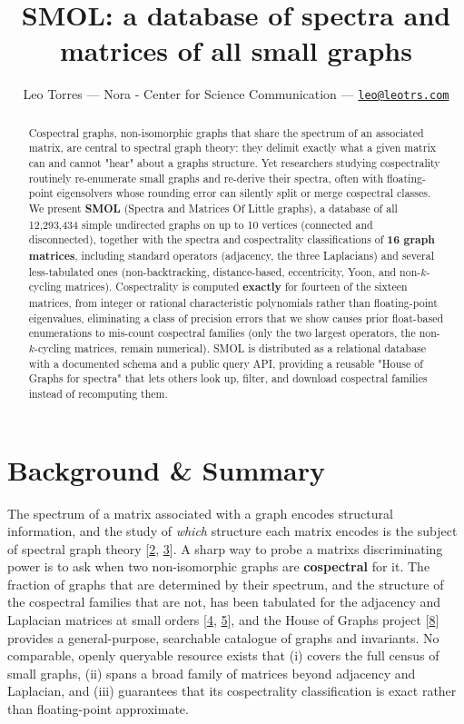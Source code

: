 \documentclass[
]{article}
\title{SMOL: a database of spectra and matrices of all small graphs}
\author{Leo Torres --- Nora - Center for Science Communication --- \href{mailto:leo@leotrs.com}{\nolinkurl{leo@leotrs.com}}}
\date{}
\begin{document}
\maketitle
\begin{abstract}
Cospectral graphs, non-isomorphic graphs that share the spectrum of an
associated matrix, are central to spectral graph theory: they delimit
exactly what a given matrix can and cannot "hear" about a
graph\textquotesingle s structure. Yet researchers studying
cospectrality routinely re-enumerate small graphs and re-derive their
spectra, often with floating-point eigensolvers whose rounding error can
silently split or merge cospectral classes. We present \textbf{SMOL}
(Spectra and Matrices Of Little graphs), a database of all 12,293,434
simple undirected graphs on up to 10 vertices (connected and
disconnected), together with the spectra and cospectrality
classifications of \textbf{16 graph matrices}, including standard
operators (adjacency, the three Laplacians) and several less-tabulated
ones (non-backtracking, distance-based, eccentricity, Yoon, and
non-\(k\)-cycling matrices). Cospectrality is computed \textbf{exactly}
for fourteen of the sixteen matrices, from integer or rational
characteristic polynomials rather than floating-point eigenvalues,
eliminating a class of precision errors that we show causes prior
float-based enumerations to mis-count cospectral families (only the two
largest operators, the non-\(k\)-cycling matrices, remain numerical).
SMOL is distributed as a relational database with a documented schema
and a public query API, providing a reusable "House of Graphs for
spectra" that lets others look up, filter, and download cospectral
families instead of recomputing them.
\end{abstract}

{\hypersetup{linkcolor=braiid-gray-900}\tableofcontents}\newpage

\section{Background \& Summary}\label{sec-background}

The spectrum of a matrix associated with a graph encodes structural
information, and the study of \emph{which} structure each matrix encodes
is the subject of spectral graph theory
{[}\hyperref[ref-brouwer2012]{2}, \hyperref[ref-cvetkovic2010]{3}{]}. A
sharp way to probe a matrix\textquotesingle s discriminating power is to
ask when two non-isomorphic graphs are \textbf{cospectral} for it. The
fraction of graphs that are determined by their spectrum, and the
structure of the cospectral families that are not, has been tabulated
for the adjacency and Laplacian matrices at small orders
{[}\hyperref[ref-vandam2003]{4}, \hyperref[ref-haemers2004]{5}{]}, and
the House of Graphs project {[}\hyperref[ref-brinkmann2013]{8}{]}
provides a general-purpose, searchable catalogue of graphs and
invariants. No comparable, openly queryable resource exists that (i)
covers the full census of small graphs, (ii) spans a broad family of
matrices beyond adjacency and Laplacian, and (iii) guarantees that its
cospectrality classification is exact rather than floating-point
approximate.
\end{document}

